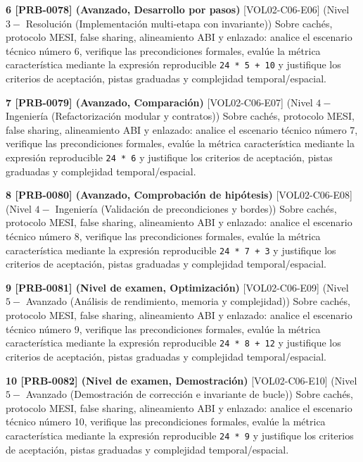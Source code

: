 \documentclass{book}
\begin{document}
\begin{tcolorbox}[title={Ejercicios}, studiumworked, breakable]
\noindent\textbf{6 [PRB-0078] (Avanzado, Desarrollo por pasos)}
[VOL02-C06-E06] (Nivel \(3 -\) Resolución (Implementación multi-etapa con invariante)) Sobre cachés, protocolo MESI, false sharing, alineamiento ABI y enlazado: analice el escenario técnico número 6, verifique las precondiciones formales, evalúe la métrica característica mediante la expresión reproducible \texttt{24 * 5 + 10} y justifique los criterios de aceptación, pistas graduadas y complejidad temporal/espacial.

\noindent\textbf{7 [PRB-0079] (Avanzado, Comparación)}
[VOL02-C06-E07] (Nivel \(4 -\) Ingeniería (Refactorización modular y contratos)) Sobre cachés, protocolo MESI, false sharing, alineamiento ABI y enlazado: analice el escenario técnico número 7, verifique las precondiciones formales, evalúe la métrica característica mediante la expresión reproducible \texttt{24 * 6} y justifique los criterios de aceptación, pistas graduadas y complejidad temporal/espacial.

\noindent\textbf{8 [PRB-0080] (Avanzado, Comprobación de hipótesis)}
[VOL02-C06-E08] (Nivel \(4 -\) Ingeniería (Validación de precondiciones y bordes)) Sobre cachés, protocolo MESI, false sharing, alineamiento ABI y enlazado: analice el escenario técnico número 8, verifique las precondiciones formales, evalúe la métrica característica mediante la expresión reproducible \texttt{24 * 7 + 3} y justifique los criterios de aceptación, pistas graduadas y complejidad temporal/espacial.

\noindent\textbf{9 [PRB-0081] (Nivel de examen, Optimización)}
[VOL02-C06-E09] (Nivel \(5 -\) Avanzado (Análisis de rendimiento, memoria y complejidad)) Sobre cachés, protocolo MESI, false sharing, alineamiento ABI y enlazado: analice el escenario técnico número 9, verifique las precondiciones formales, evalúe la métrica característica mediante la expresión reproducible \texttt{24 * 8 + 12} y justifique los criterios de aceptación, pistas graduadas y complejidad temporal/espacial.

\noindent\textbf{10 [PRB-0082] (Nivel de examen, Demostración)}
[VOL02-C06-E10] (Nivel \(5 -\) Avanzado (Demostración de corrección e invariante de bucle)) Sobre cachés, protocolo MESI, false sharing, alineamiento ABI y enlazado: analice el escenario técnico número 10, verifique las precondiciones formales, evalúe la métrica característica mediante la expresión reproducible \texttt{24 * 9} y justifique los criterios de aceptación, pistas graduadas y complejidad temporal/espacial.


\end{tcolorbox}
\end{document}
